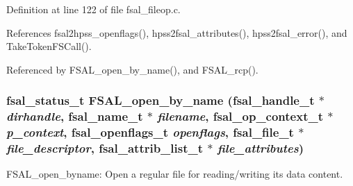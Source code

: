 Definition at line 122 of file fsal\_\-fileop.c.

References fsal2hpss\_\-openflags(), hpss2fsal\_\-attributes(), hpss2fsal\_\-error(), and TakeTokenFSCall().

Referenced by FSAL\_\-open\_\-by\_\-name(), and FSAL\_\-rcp().
\subsubsection[{FSAL\_\-open\_\-by\_\-name}]{\setlength{\rightskip}{0pt plus 5cm}fsal\_\-status\_\-t FSAL\_\-open\_\-by\_\-name (fsal\_\-handle\_\-t $\ast$ {\em dirhandle}, \/  fsal\_\-name\_\-t $\ast$ {\em filename}, \/  fsal\_\-op\_\-context\_\-t $\ast$ {\em p\_\-context}, \/  fsal\_\-openflags\_\-t {\em openflags}, \/  fsal\_\-file\_\-t $\ast$ {\em file\_\-descriptor}, \/  fsal\_\-attrib\_\-list\_\-t $\ast$ {\em file\_\-attributes})}\label{fsal__fileop_8c_6c899c64e18d90528a018989cc2484c5}


FSAL\_\-open\_\-byname: Open a regular file for reading/writing its data content.

